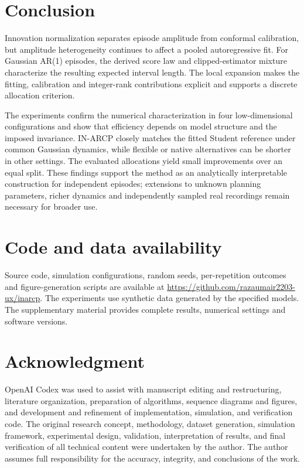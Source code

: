 \documentclass[nolineno]{ieeeaccess}
\begin{document}
\section{Conclusion}
Innovation normalization separates episode amplitude from conformal calibration, but amplitude heterogeneity continues to affect a pooled autoregressive fit. For Gaussian AR(1) episodes, the derived score law and clipped-estimator mixture characterize the resulting expected interval length. The local expansion makes the fitting, calibration and integer-rank contributions explicit and supports a discrete allocation criterion.

The experiments confirm the numerical characterization in four low-dimensional configurations and show that efficiency depends on model structure and the imposed invariance. IN-ARCP closely matches the fitted Student reference under common Gaussian dynamics, while flexible or native alternatives can be shorter in other settings. The evaluated allocations yield small improvements over an equal split. These findings support the method as an analytically interpretable construction for independent episodes; extensions to unknown planning parameters, richer dynamics and independently sampled real recordings remain necessary for broader use.

\section*{Code and data availability}
Source code, simulation configurations, random seeds, per-repetition outcomes and figure-generation scripts are available at \url{https://github.com/razaumair2203-ux/inarcp}. The experiments use synthetic data generated by the specified models. The supplementary material provides complete results, numerical settings and software versions.

\section*{Acknowledgment}
OpenAI Codex was used to assist with manuscript editing and restructuring, literature organization, preparation of algorithms, sequence diagrams and figures, and development and refinement of implementation, simulation, and verification code. The original research concept, methodology, dataset generation, simulation framework, experimental design, validation, interpretation of results, and final verification of all technical content were undertaken by the author. The author assumes full responsibility for the accuracy, integrity, and conclusions of the work.
\end{document}
